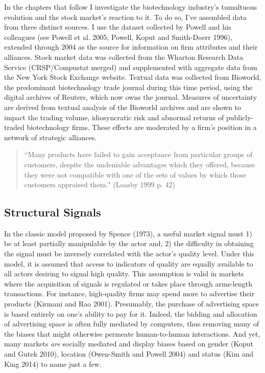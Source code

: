 In the chapters that follow I investigate the biotechnology industry's tumultuous evolution and the stock market's reaction to it. To do so, I've assembled data from three distinct sources. I use the dataset collected by Powell and his colleagues (see Powell et al. 2005; Powell, Koput and Smith-Doerr 1996), extended through 2004 as the source for information on firm attributes and their alliances. Stock market data was collected from the Wharton Research Data Service (CRSP/Compustat merged) and supplemented with aggregate data from the New York Stock Exchange website. Textual data was collected from Bioworld, the predominant biotechnology trade journal during this time period, using the digital archives of Reuters, which now owns the journal. Measures of uncertainty are derived from textual analysis of the Bioworld archives and are shown to impact the trading volume, idiosyncratic risk and abnormal returns of publicly-traded biotechnology firms. These effects are moderated by a firm's position in a network of strategic alliances.


\begin{small}
\begin{quote}
``Many products have failed to gain acceptance from particular groups of customers, despite the undeniable advantages which they offered, because they were not compatible with one of the sets of values by which those customers appraised them." (Loasby 1999 p. 42) 
\end{quote}
\end{small}

\subsection{Structural Signals}
In the classic model proposed by Spence (1973), a useful market signal must 1) be at least partially manipulable by the actor and, 2) the difficulty in obtaining the signal must be inversely correlated with the actor's quality level. Under this model, it is assumed that access to indicators of quality are equally available to all actors desiring to signal high quality. This assumption is valid in markets where the acquisition of signals is regulated or takes place through arms-length transactions. For instance, high-quality firms may spend more to advertise their products (Kirmani and Rao 2001). Presumably, the purchase of advertising space is based entirely on one's ability to pay for it. Indeed, the bidding and allocation of advertising space is often fully mediated by computers, thus removing many of the biases that might otherwise permeate human-to-human interactions. And yet, many markets {\it are} socially mediated and display biases based on gender (Koput and Gutek 2010), location (Owen-Smith and Powell 2004) and status (Kim and King 2014) to name just a few. 

